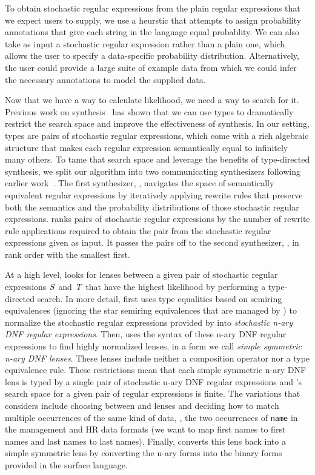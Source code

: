 \documentclass[acmsmall,screen,anonymous]{acmart}
\begin{document}
To obtain stochastic regular expressions from the plain regular
expressions that we expect users to supply, we use a heurstic 
that attempts to assign
probability annotations that give each string in the language equal
probablity.  We can also take as input a stochastic regular
expression rather than a plain one, which allows the user to
specify a data-specific probability distribution.  Alternatively,
the user could provide a large suite of example data from which we
could infer the necessary annotations to model the supplied data. 

Now that we have a way to calculate likelihood, we need a way to search for
it.
Previous work on synthesis~ has shown
that we can use types to dramatically restrict the search space and
improve the effectiveness of synthesis.  In our setting, types are
pairs of stochastic regular expressions, which come with a rich
algebraic structure that makes each regular expression semantically
equal to infinitely many others.  To tame that search space and
leverage the benefits of type-directed synthesis, we split our
algorithm into two communicating synthesizers following earlier
work~\cite{quotient-lens-synthesis}.  The first
synthesizer, \RXSearch, navigates the space of semantically equivalent
regular expressions by iteratively applying rewrite rules that
preserve both the semantics and the probability
distributions of those stochastic regular expressions. \RXSearch
ranks pairs of stochastic regular expressions 
by the number of rewrite rule applications required to obtain the pair
from the stochastic regular expressions given as input. It passes the
pairs off to the second synthesizer, \GreedySynth, in rank order with
the smallest first.

At a high level, \GreedySynth looks for lenses between a given pair of
stochastic regular expressions $\mathit{S}$ and $\mathit{T}$ that have the
highest likelihood by performing a type-directed search. 
In more detail, \GreedySynth first uses type equalities based on semiring 
equivalences (ignoring the star semiring equivalences that are managed
by \RXSearch) to normalize the
stochastic regular expressions provided by \RXSearch into 
\emph{stochastic n-ary DNF regular expressions}.  
Then, \GreedySynth uses the syntax of these n-ary DNF regular
expressions to find highly normalized lenses, in a
form we call \emph{simple symmetric n-ary DNF lenses}.  These lenses include
neither a composition operator nor a type equivalence rule.  These
restrictions mean that each simple symmetric n-ary DNF lens is typed
by a single pair of stochastic n-ary DNF regular expressions and 
\GreedySynth's search space for a given pair of regular expressions is
finite.  The variations that \GreedySynth 
considers include choosing between \IdentityLens{} and  \Disconnect
lenses and deciding how to match multiple occurrences of the same kind
of data, \EG, the two occurrences of \lstinline{name} in the
management and HR data formats (we want to map first names to first
names and last names to last names). 
Finally, \GreedySynth converts this lens 
back into a simple symmetric lens by converting the n-ary forms into
the binary forms provided in the surface language.  
\end{document}
